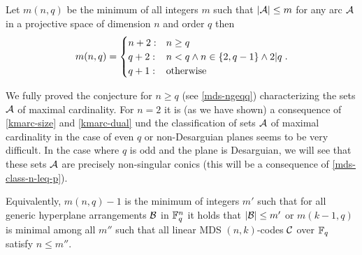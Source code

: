 \begin{conjecture}
  Let $m(n,q)$ be the minimum of all integers $m$ such that $\left|\mathcal{A}\right|\leq m$ for any arc $\mathcal{A}$ in a projective space of dimension $n$ and order $q$ then
  $$
    m(n,q)=\begin{cases}
      n+2 :& n \geq q\\
      q+2 :& n<q \wedge n\in\{2,q-1\} \wedge 2| q\\
      q+1 :& \textrm{otherwise}
    \end{cases}.
    $$
\end{conjecture}

\begin{remark}%
    We fully proved the conjecture for $n\geq q$ (see \autoref{mds-ngeqq}) characterizing the sets $\mathcal{A}$ of maximal cardinality. For $n=2$ it is (as we have shown) a consequence of \autoref{kmarc-size} and \autoref{kmarc-dual} und the classification of sets $\mathcal{A}$ of maximal cardinality in the case of even $q$ or non-Desarguian planes seems to be very difficult. In the case where $q$ is odd and the plane is Desarguian, we will see that these sets $\mathcal{A}$ are precisely non-singular conics (this will be a consequence of \autoref{mds-class-n-leq-p}).
\end{remark}

\begin{remark}\label{mds-mainconjotherobj}
    Equivalently, $m(n,q)-1$ is the minimum of integers $m'$ such that for all generic hyperplane arrangements $\mathcal{B}$ in $\mathbb{F}_{q}^n$ it holds that $\left|\mathcal{B}\right|\leq m'$ or $m(k-1,q)$ is minimal among all $m''$ such that all linear MDS $(n,k)$-codes $\mathcal{C}$ over $\mathbb{F}_{q}$ satisfy $n\leq m''$.
\end{remark}





